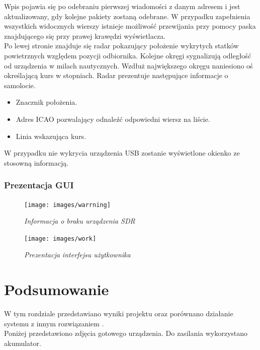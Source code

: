 \documentclass[eng,printmode]{mgr}
\begin{document}
Wpis pojawia się po odebraniu pierwszej wiadomości z danym adresem i jest aktualizowany, gdy kolejne pakiety zostaną odebrane. W przypadku zapełnienia wszystkich widocznych wierszy istnieje możliwość przewijania przy pomocy paska znajdującego się przy prawej krawędzi wyświetlacza.
\\

Po lewej stronie znajduje się radar pokazujący położenie wykrytych statków powietrznych względem pozycji odbiornika. Kolejne okręgi sygnalizują odległość od urządzenia w milach nautycznych. Wzdłuż największego okręgu naniesiono oś określającą kurs w stopniach. Radar prezentuje następujące informacje o samolocie.
\begin{itemize}
\item Znacznik położenia.
\item Adres ICAO pozwalający odnaleźć odpowiedni wiersz na liście.
\item Linia wskazująca kurs.
\end{itemize}
\skip 0.5cm


W przypadku nie wykrycia urządzenia USB zostanie wyświetlone okienko ze stosowną informacją.
\newpage
\subsection*{Prezentacja GUI}
\vskip 1cm
\begin{figure}[!h]
    \centering
    \texttt{[image: images/warrning]}
    \caption{\textit{Informacja o braku urządzenia SDR}}
\end{figure}
\vskip 1cm
\begin{figure}[!h]
    \centering
    \texttt{[image: images/work]}
    \caption{\textit{Prezentacja interfejsu użytkownika}}
\end{figure}
\newpage

\chapter{ Podsumowanie }
W tym rozdziale przedstawiano wyniki projektu oraz porównano działanie systemu z innym rozwiązaniem .
\\


Poniżej przedstawiono zdjęcia gotowego urządzenia. Do zasilania wykorzystano akumulator.
\end{document}
